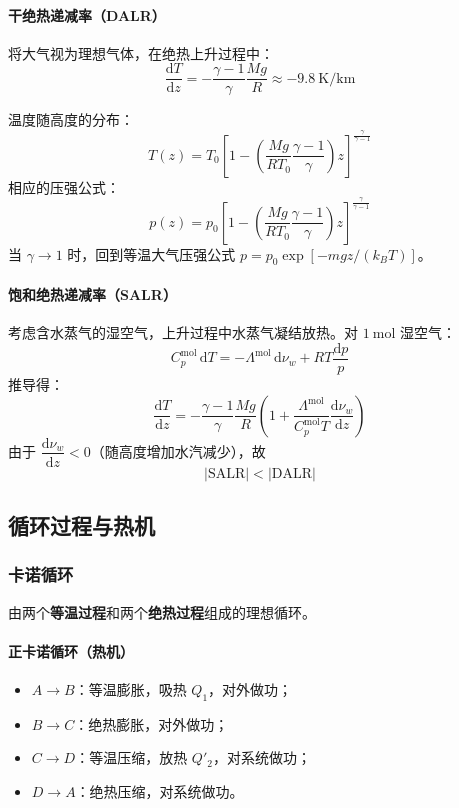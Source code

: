 \documentclass[UTF8]{ctexart}
\begin{document}
\paragraph{干绝热递减率（DALR）}
将大气视为理想气体，在绝热上升过程中：
\[
\frac{\mathrm{d}T}{\mathrm{d}z}=-\frac{\gamma-1}{\gamma}\frac{Mg}{R}\approx -9.8\ \mathrm{K/km}
\]

温度随高度的分布：
\[
T(z)=T_0\left[1-\left(\frac{Mg}{RT_0}\frac{\gamma-1}{\gamma}\right)z\right]^{\frac{\gamma}{\gamma-1}}
\]
相应的压强公式：
\[
p(z)=p_0\left[1-\left(\frac{Mg}{RT_0}\frac{\gamma-1}{\gamma}\right)z\right]^{\frac{\gamma}{\gamma-1}}
\]
当 $\gamma\to 1$ 时，回到等温大气压强公式 $p=p_0\exp[-mgz/(k_BT)]$。

\paragraph{饱和绝热递减率（SALR）}
考虑含水蒸气的湿空气，上升过程中水蒸气凝结放热。对 $1\ \mathrm{mol}$ 湿空气：
\[
C_p^{\mathrm{mol}}\,\mathrm{d}T=-\Lambda^{\mathrm{mol}}\,\mathrm{d}\nu_w+RT\frac{\mathrm{d}p}{p}
\]
推导得：
\[
\frac{\mathrm{d}T}{\mathrm{d}z}
=-\frac{\gamma-1}{\gamma}\frac{Mg}{R}\left(1+\frac{\Lambda^{\mathrm{mol}}}{C_p^{\mathrm{mol}}T}\frac{\mathrm{d}\nu_w}{\mathrm{d}z}\right)
\]
由于 $\dfrac{\mathrm{d}\nu_w}{\mathrm{d}z}<0$（随高度增加水汽减少），故
\[
\boxed{|\mathrm{SALR}|<|\mathrm{DALR}|}
\]


\subsection{循环过程与热机}

\subsubsection{卡诺循环}

由两个\textbf{等温过程}和两个\textbf{绝热过程}组成的理想循环。

\paragraph{正卡诺循环（热机）}
\begin{itemize}[leftmargin=2em]
  \item $A\to B$：等温膨胀，吸热 $Q_1$，对外做功；
  \item $B\to C$：绝热膨胀，对外做功；
  \item $C\to D$：等温压缩，放热 $Q'_2$，对系统做功；
  \item $D\to A$：绝热压缩，对系统做功。
\end{itemize}
\end{document}
